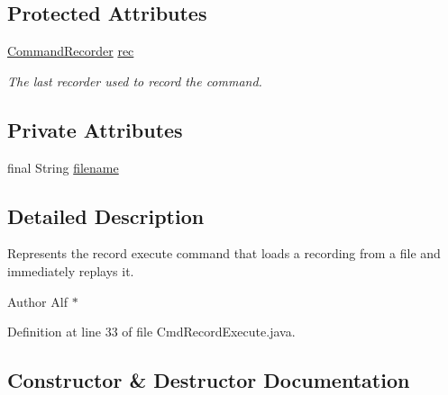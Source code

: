 \subsection*{Protected Attributes}
\begin{DoxyCompactItemize}
\item 
\hyperlink{classgov_1_1nasa_1_1jpf_1_1inspector_1_1client_1_1_command_recorder}{Command\+Recorder} \hyperlink{classgov_1_1nasa_1_1jpf_1_1inspector_1_1client_1_1_client_command_af4246f2427035c72a6af45a2c61361f7}{rec}
\begin{DoxyCompactList}\small\item\em The last recorder used to record the command. \end{DoxyCompactList}\end{DoxyCompactItemize}
\subsection*{Private Attributes}
\begin{DoxyCompactItemize}
\item 
final String \hyperlink{classgov_1_1nasa_1_1jpf_1_1inspector_1_1client_1_1commands_1_1_cmd_record_execute_afb4cff074ad1e98dae860a1f74b83731}{filename}
\end{DoxyCompactItemize}


\subsection{Detailed Description}
Represents the \textquotesingle{}record execute\textquotesingle{} command that loads a recording from a file and immediately replays it. 

\begin{DoxyAuthor}{Author}
Alf $\ast$ 
\end{DoxyAuthor}


Definition at line 33 of file Cmd\+Record\+Execute.\+java.



\subsection{Constructor \& Destructor Documentation}
